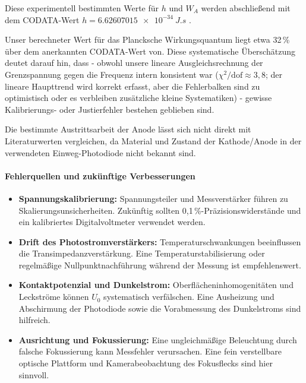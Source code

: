 Diese experimentell bestimmten Werte für $h$ und $W_{A}$ werden abschließend mit dem CODATA-Wert $h=\SI{6.626 070 15e-34}{J.s}$ \cite{codata}.


Unser berechneter Wert für das Plancksche Wirkungsquantum liegt etwa 32\,\% über dem anerkannten CODATA-Wert von. Diese systematische Überschätzung deutet darauf hin, dass - obwohl unsere lineare Ausgleichsrechnung der Grenzspannung gegen die Frequenz intern konsistent war (\(\chi^2/\mathrm{dof}\approx3{,}8\); der lineare Haupttrend wird korrekt erfasst, aber die Fehlerbalken sind zu optimistisch oder es verbleiben zusätzliche kleine Systematiken) - gewisse Kalibrierungs- oder Justierfehler bestehen geblieben sind.

Die bestimm­te Austrittsarbeit der Anode lässt sich nicht direkt mit Literaturwerten vergleichen, da Material
und Zustand der Kathode/Anode in der verwendeten Einweg-Photodiode nicht
bekannt sind.

\paragraph{Fehlerquellen und zukünftige Verbesserungen}

\begin{itemize}
  \item \textbf{Spannungskalibrierung:} Spannungsteiler und Messverstärker führen zu
    Skalierungsunsicherheiten. Zukünftig sollten 0{,}1\,\%-Präzisionswiderstände
    und ein kalibriertes Digitalvoltmeter verwendet werden.

  \item \textbf{Drift des Photostromverstärkers:} Temperaturschwankungen beeinflussen
    die Transimpedanzverstärkung. Eine Temperaturstabilisierung oder regelmäßige
    Nullpunktnachführung während der Messung ist empfehlenswert.

  \item \textbf{Kontaktpotenzial und Dunkelstrom:} Oberflächeninhomogenitäten und
    Leckströme können \(U_0\) systematisch verfälschen. Eine Ausheizung und
    Abschirmung der Photodiode sowie die Vorabmessung des Dunkelstroms sind
    hilfreich.

  \item \textbf{Ausrichtung und Fokussierung:} Eine ungleichmäßige Beleuchtung durch
    falsche Fokussierung kann Messfehler verursachen. Eine fein verstellbare
    optische Plattform und Kamerabeobachtung des Fokusflecks sind hier sinnvoll.
\end{itemize}
